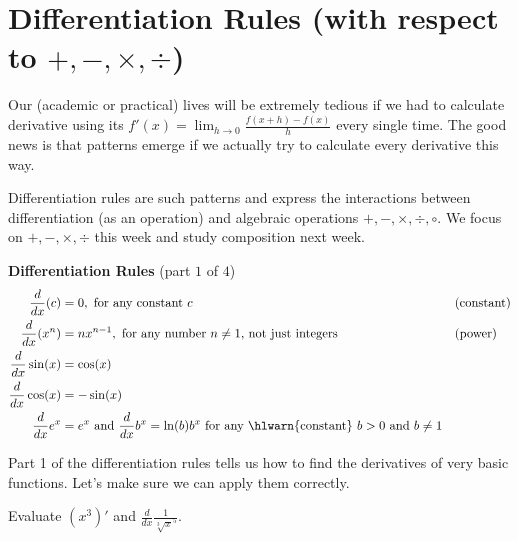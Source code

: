 \documentclass[../main.tex]{subfiles}
\begin{document}
 \section{Differentiation Rules (with respect to \(+,-,\times,\div\))}
  Our (academic or practical) lives will be extremely tedious if we had to calculate derivative using its \(f'(x) = \lim_{h \to 0} {\textstyle\frac{f(x+h) - f(x)}{h}}\) every single time.  The good news is that patterns emerge if we actually try to calculate every derivative this way. 

  Differentiation rules are such patterns and express the interactions between differentiation (as an operation) and algebraic operations \(+, -, \times, \div, \circ\). We focus on \(+, -, \times, \div\) this week and study composition next week.

  \begin{mdframed}[style=simple] \label{thm:diff-rules-1}
    \textbf{Differentiation Rules} \hfill {\footnotesize (part \(1\) of \(4\))}
    \begin{align*}
      \frac{d}{dx} (c)
    &= 0, \text{ for any constant \(c\)}
    && \text{(constant)} \\
    \frac{d}{dx} (x^{n})
    &= n x^{n-1}, \text{ for any number \(n \ne 1\), not just integers} 
    && \text{(power)} \\
    \frac{d}{dx} \sin(x)
    &= \cos(x) \\
    \frac{d}{dx} \cos(x)
    &= -\sin(x) \\
      \frac{d}{dx} e^{x} &= e^{x} \text{ and } \frac{d}{dx}b^{x} = \ln(b)b^{x} \text{ for any \hlwarn{constant} } b > 0 \text{ and } b \ne 1
    \end{align*}
  \end{mdframed}

  Part 1 of the differentiation rules tells us how to find the derivatives of very basic functions. Let's make sure we can apply them correctly.

  \begin{example}
    Evaluate \((x^{3})'\) and \(\frac{d}{dx}\frac{1}{\sqrt[3]{x}^{5}}\).

  \end{example}

\end{document}
